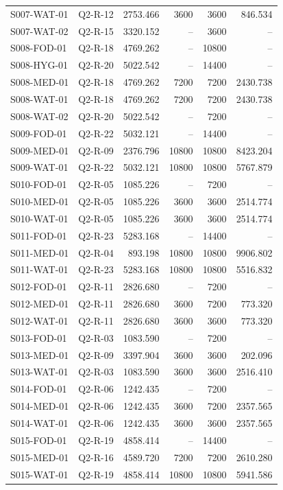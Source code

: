 \begin{longtable}{@{}llrrrr@{}}
S007-WAT-01 & Q2-R-12 & 2753.466 & 3600 & 3600 & 846.534\\
S007-WAT-02 & Q2-R-15 & 3320.152 & -- & 3600 & --\\
S008-FOD-01 & Q2-R-18 & 4769.262 & -- & 10800 & --\\
S008-HYG-01 & Q2-R-20 & 5022.542 & -- & 14400 & --\\
S008-MED-01 & Q2-R-18 & 4769.262 & 7200 & 7200 & 2430.738\\
S008-WAT-01 & Q2-R-18 & 4769.262 & 7200 & 7200 & 2430.738\\
S008-WAT-02 & Q2-R-20 & 5022.542 & -- & 7200 & --\\
S009-FOD-01 & Q2-R-22 & 5032.121 & -- & 14400 & --\\
S009-MED-01 & Q2-R-09 & 2376.796 & 10800 & 10800 & 8423.204\\
S009-WAT-01 & Q2-R-22 & 5032.121 & 10800 & 10800 & 5767.879\\
S010-FOD-01 & Q2-R-05 & 1085.226 & -- & 7200 & --\\
S010-MED-01 & Q2-R-05 & 1085.226 & 3600 & 3600 & 2514.774\\
S010-WAT-01 & Q2-R-05 & 1085.226 & 3600 & 3600 & 2514.774\\
S011-FOD-01 & Q2-R-23 & 5283.168 & -- & 14400 & --\\
S011-MED-01 & Q2-R-04 & 893.198 & 10800 & 10800 & 9906.802\\
S011-WAT-01 & Q2-R-23 & 5283.168 & 10800 & 10800 & 5516.832\\
S012-FOD-01 & Q2-R-11 & 2826.680 & -- & 7200 & --\\
S012-MED-01 & Q2-R-11 & 2826.680 & 3600 & 7200 & 773.320\\
S012-WAT-01 & Q2-R-11 & 2826.680 & 3600 & 3600 & 773.320\\
S013-FOD-01 & Q2-R-03 & 1083.590 & -- & 7200 & --\\
S013-MED-01 & Q2-R-09 & 3397.904 & 3600 & 3600 & 202.096\\
S013-WAT-01 & Q2-R-03 & 1083.590 & 3600 & 3600 & 2516.410\\
S014-FOD-01 & Q2-R-06 & 1242.435 & -- & 7200 & --\\
S014-MED-01 & Q2-R-06 & 1242.435 & 3600 & 7200 & 2357.565\\
S014-WAT-01 & Q2-R-06 & 1242.435 & 3600 & 3600 & 2357.565\\
S015-FOD-01 & Q2-R-19 & 4858.414 & -- & 14400 & --\\
S015-MED-01 & Q2-R-16 & 4589.720 & 7200 & 7200 & 2610.280\\
S015-WAT-01 & Q2-R-19 & 4858.414 & 10800 & 10800 & 5941.586\\
\bottomrule
\end{longtable}
